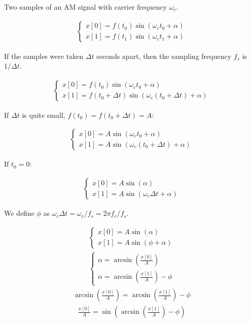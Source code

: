 \documentclass[fleqn]{article}
\begin{document}
\pagestyle{empty}

Two samples of an AM signal with carrier frequency $\omega_c$.

\begin{align*}
\begin{cases}
x[0]=f(t_{0})\sin(\omega_c t_{0}+\alpha)\\
x[1]=f(t_{1})\sin(\omega_c t_{1}+\alpha)
\end{cases}
\end{align*}

If the samples were taken $\Delta t$ seconds apart, then the sampling frequency
$f_s$ is $1/\Delta t$.

\begin{align*}
\begin{cases}
x[0]=f(t_{0})\sin(\omega_c t_{0}+\alpha)\\
x[1]=f(t_{0}+\Delta t)\sin(\omega_c (t_{0}+\Delta t)+\alpha)
\end{cases}
\end{align*}

If $\Delta t$ is quite small, $f(t_0) = f(t_0 + \Delta t) = A$: 

\begin{align*}
\begin{cases}
x[0]=A\sin(\omega_c t_{0}+\alpha)\\
x[1]=A\sin(\omega_c (t_{0}+\Delta t)+\alpha)
\end{cases}
\end{align*}

If $t_0 = 0$:

\begin{align*}
\begin{cases}
x[0]=A\sin(\alpha)\\
x[1]=A\sin(\omega_c \Delta t+\alpha)
\end{cases}
\end{align*}

We define $\phi$ as $\omega_c \Delta t = \omega_c / f_s = 2\pi f_c / f_s$.

\begin{align*}
\begin{cases}
x[0]=A\sin(\alpha)\\
x[1]=A\sin(\phi+\alpha)
\end{cases}
\end{align*}
\begin{align*}
\begin{cases}
\alpha=\arcsin\left(\frac{x[0]}{A}\right)\\
\alpha=\arcsin\left(\frac{x[1]}{A}\right)-\phi
\end{cases}
\end{align*}
\begin{align*}
\arcsin\left(\frac{x[0]}{A}\right)=\arcsin\left(\frac{x[1]}{A}\right)-\phi
\end{align*}
\begin{align*}
\frac{x[0]}{A}=\sin\left(\arcsin\left(\frac{x[1]}{A}\right)-\phi\right)
\end{align*}
\end{document}
